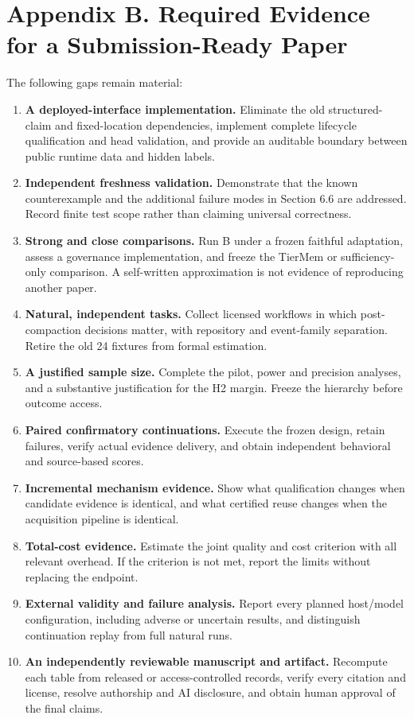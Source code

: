 \documentclass[
  11pt,
  a4paper,
]{article}
\providecommand{\tightlist}{%
  \setlength{\itemsep}{0pt}\setlength{\parskip}{0pt}}
\begin{document}
\section{Appendix B. Required Evidence for a Submission-Ready
Paper}\label{appendix-b.-required-evidence-for-a-submission-ready-paper}

The following gaps remain material:

\begin{enumerate}
\def\labelenumi{\arabic{enumi}.}
\tightlist
\item
  \textbf{A deployed-interface implementation.} Eliminate the old
  structured-claim and fixed-location dependencies, implement complete
  lifecycle qualification and head validation, and provide an auditable
  boundary between public runtime data and hidden labels.
\item
  \textbf{Independent freshness validation.} Demonstrate that the known
  counterexample and the additional failure modes in Section 6.6 are
  addressed. Record finite test scope rather than claiming universal
  correctness.
\item
  \textbf{Strong and close comparisons.} Run B under a frozen faithful
  adaptation, assess a governance implementation, and freeze the TierMem
  or sufficiency-only comparison. A self-written approximation is not
  evidence of reproducing another paper.
\item
  \textbf{Natural, independent tasks.} Collect licensed workflows in
  which post-compaction decisions matter, with repository and
  event-family separation. Retire the old 24 fixtures from formal
  estimation.
\item
  \textbf{A justified sample size.} Complete the pilot, power and
  precision analyses, and a substantive justification for the H2 margin.
  Freeze the hierarchy before outcome access.
\item
  \textbf{Paired confirmatory continuations.} Execute the frozen design,
  retain failures, verify actual evidence delivery, and obtain
  independent behavioral and source-based scores.
\item
  \textbf{Incremental mechanism evidence.} Show what qualification
  changes when candidate evidence is identical, and what certified reuse
  changes when the acquisition pipeline is identical.
\item
  \textbf{Total-cost evidence.} Estimate the joint quality and cost
  criterion with all relevant overhead. If the criterion is not met,
  report the limits without replacing the endpoint.
\item
  \textbf{External validity and failure analysis.} Report every planned
  host/model configuration, including adverse or uncertain results, and
  distinguish continuation replay from full natural runs.
\item
  \textbf{An independently reviewable manuscript and artifact.}
  Recompute each table from released or access-controlled records,
  verify every citation and license, resolve authorship and AI
  disclosure, and obtain human approval of the final claims.
\end{enumerate}
\end{document}
